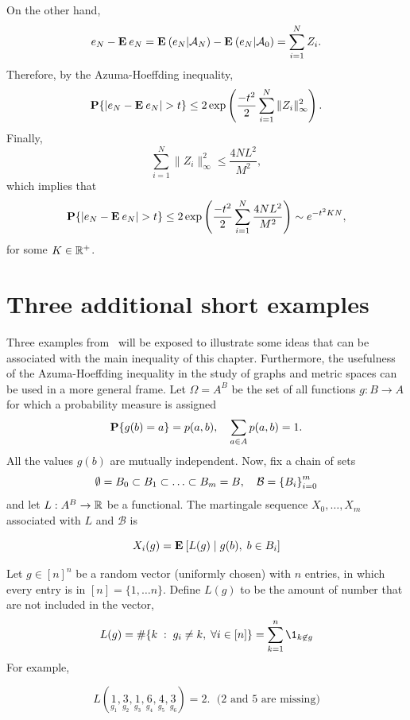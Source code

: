 On the other hand,
\[  e_N - \E e_N = \E (e_N | \A_N) - \E (e_N | \A_{0}) = \sum_{i = 1}^{N} Z_i.\]
Therefore, by the Azuma-Hoeffding inequality,
\[ \P \{ |e_N - \E e_N| > t \} \leq 2\exp\left(\frac{-t^2}{2}\sum_{i = 1}^{N} \|Z_i\|_{\infty}^2 \right). \] 
Finally,
\[ \sum_{i = 1}^{N} \|Z_i\|_{\infty}^2 \leq \frac{4NL^2}{M^2}, \]
which implies that
\[\P \{ |e_N - \E e_N| > t \} \leq 2\exp\left(\frac{-t^2}{2}\sum_{i = 1}^{N} \frac{4NL^2}{M^2} \right) \sim e^{-t^{2} K N}, \] 
for some $K\in \R^+$.

\section{Three additional short examples}

Three examples from~\cite{alon2016probabilistic} will be exposed to illustrate some ideas that can be associated with the main inequality of this chapter. Furthermore, the usefulness of the Azuma-Hoeffding inequality in the study of graphs and metric spaces can be used in a more general frame. Let $\Omega = A^B$ be the set of all functions $g: B\to A$ for which a probability measure is assigned
\[ \P\{g(b) = a\} = p(a,b),\hspace*{1em} \sum_{a\in A} p(a,b) = 1. \]
All the values $g(b)$ are mutually independent. Now, fix a chain of sets 
\[ \emptyset = B_0 \subset B_1 \subset \ldots \subset B_m = B,\hspace*{1em} \mathcal{B} = {\{B_i\}}_{i = 0}^m \]
and let $L: A^B \to \R$ be a functional. The martingale sequence $X_0,\ldots, X_m$ associated with $L$ and $\mathcal{B}$ is

\[ X_i(g) = \E[ L(g) \;|\; g(b),\; b\in B_i ] \] 

\begin{theorem}\label{lipschitz-condition}
    
\end{theorem}


Let $g \in {[n]}^{n}$ be a random vector (uniformly chosen) with $n$ entries, in which every entry is in $[n] = \{1,\ldots n\}$. Define $L(g)$ to be the amount of number that are not included in the vector,
\[ L(g) = \# \{ k \;:\; g_i \neq k,\; \forall i \in [n]\} = \sum_{k = 1}^{n} \1_{k \not\in g} \] 
For example,

\[ L(\underset{g_1}{1},\underset{g_2}{3},\underset{g_3}{1},\underset{g_4}{6},\underset{g_5}{4},\underset{g_6}{3}) = 2.\;\text{ (2 and 5 are missing)} \]


